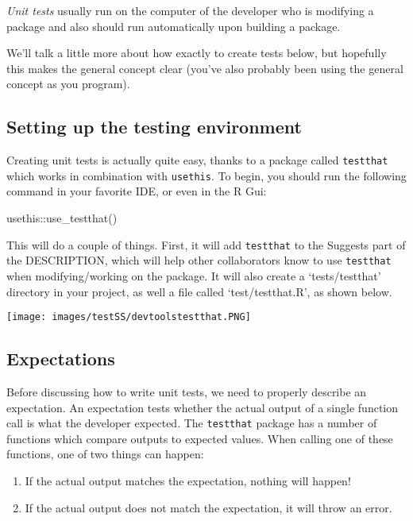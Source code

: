 \documentclass[
]{book}
\newenvironment{Shaded}{\begin{snugshade}}{\end{snugshade}}
\newcommand{\FunctionTok}[1]{\textcolor[rgb]{0.00,0.00,0.00}{#1}}
\newcommand{\NormalTok}[1]{#1}
\newcommand{\SpecialCharTok}[1]{\textcolor[rgb]{0.00,0.00,0.00}{#1}}
\providecommand{\tightlist}{%
  \setlength{\itemsep}{0pt}\setlength{\parskip}{0pt}}
\begin{document}
\emph{Unit tests} usually run on the computer of the developer who is modifying a package and also should run automatically upon building a package.

We'll talk a little more about how exactly to create tests below, but hopefully this makes the general concept clear (you've also probably been using the general concept as you program).

\hypertarget{setting-up-the-testing-environment}{%
\subsection{Setting up the testing environment}\label{setting-up-the-testing-environment}}

Creating unit tests is actually quite easy, thanks to a package called \texttt{testthat} which works in combination with \texttt{usethis}. To begin, you should run the following command in your favorite IDE, or even in the R Gui:

\begin{Shaded}
\begin{Highlighting}[]
\NormalTok{usethis}\SpecialCharTok{::}\FunctionTok{use\_testthat}\NormalTok{()}
\end{Highlighting}
\end{Shaded}

This will do a couple of things. First, it will add \texttt{testthat} to the Suggests part of the DESCRIPTION, which will help other collaborators know to use \texttt{testthat} when modifying/working on the package. It will also create a `tests/testthat' directory in your project, as well a file called `test/testthat.R', as shown below.

\texttt{[image: images/testSS/devtoolstestthat.PNG]}

\hypertarget{expectations}{%
\subsection{Expectations}\label{expectations}}

Before discussing how to write unit tests, we need to properly describe an expectation. An expectation tests whether the actual output of a single function call is what the developer expected. The \texttt{testthat} package has a number of functions which compare outputs to expected values. When calling one of these functions, one of two things can happen:

\begin{enumerate}
\def\labelenumi{\arabic{enumi}.}
\tightlist
\item
  If the actual output matches the expectation, nothing will happen!
\item
  If the actual output does not match the expectation, it will throw an error.
\end{enumerate}
\end{document}
